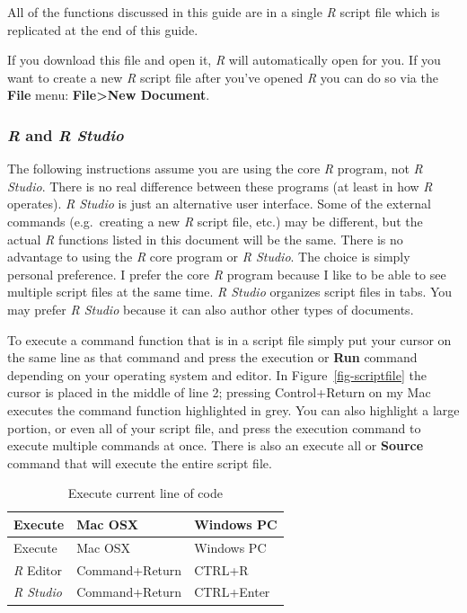 \documentclass[
  10pt,
  letterpaper]{article}
\renewcommand\texttt[1]{{\ttfamily\color{BrickRed}#1}}
\begin{document}
All of the functions discussed in this guide are in a single \emph{R}
script file which is replicated at the end of this guide.

If you download this file and open it, \emph{R} will automatically open
for you. If you want to create a new \emph{R} script file after you've
opened \emph{R} you can do so via the \textbf{File} menu:
\textbf{File\textgreater New Document}.

\hypertarget{r-and-r-studio}{%
\subsubsection{\texorpdfstring{\emph{R} and \emph{R
Studio}}{R and R Studio}}\label{r-and-r-studio}}

The following instructions assume you are using the core \emph{R}
program, not \emph{R Studio}. There is no real difference between these
programs (at least in how \emph{R} operates). \emph{R Studio} is just an
alternative user interface. Some of the external commands (e.g.~creating
a new \emph{R} script file, etc.) may be different, but the actual
\emph{R} functions listed in this document will be the same. There is no
advantage to using the \emph{R} core program or \emph{R Studio}. The
choice is simply personal preference. I prefer the core \emph{R} program
because I like to be able to see multiple script files at the same time.
\emph{R Studio} organizes script files in tabs. You may prefer \emph{R
Studio} because it can also author other types of documents.

To execute a command function that is in a script file simply put your
cursor on the same line as that command and press the execution or
\textbf{Run} command depending on your operating system and editor. In
Figure~\ref{fig-scriptfile} the cursor is placed in the middle of line
2; pressing \texttt{Control+Return} on my Mac executes the command
function highlighted in grey. You can also highlight a large portion, or
even all of your script file, and press the execution command to execute
multiple commands at once. There is also an execute all or
\textbf{Source} command that will execute the entire script file.

\hypertarget{tbl-execute}{}
\begin{longtable}[]{@{}lll@{}}
\caption{\label{tbl-execute}Execute current line of code}\tabularnewline
\toprule()
Execute & Mac OSX & Windows PC \\
\midrule()
\endfirsthead
\toprule()
Execute & Mac OSX & Windows PC \\
\midrule()
\endhead
\emph{R} Editor & \texttt{Command+Return} & \texttt{CTRL+R} \\
\emph{R Studio} & \texttt{Command+Return} & \texttt{CTRL+Enter} \\
\bottomrule()
\end{longtable}
\end{document}
